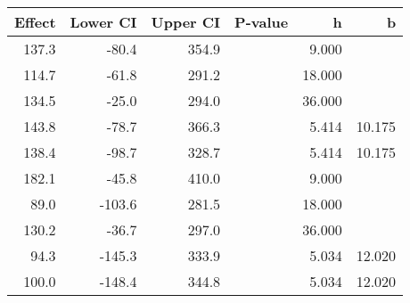 \begin{table}[ht]
\centering
\begin{tabular}{rrrrrr}
  \hline
Effect & Lower CI & Upper CI & P-value & h & b \\ 
  \hline
137.3 & -80.4 & 354.9 &  & 9.000 &  \\ 
  114.7 & -61.8 & 291.2 &  & 18.000 &  \\ 
  134.5 & -25.0 & 294.0 &  & 36.000 &  \\ 
  143.8 & -78.7 & 366.3 &  & 5.414 & 10.175 \\ 
  138.4 & -98.7 & 328.7 &  & 5.414 & 10.175 \\ 
  182.1 & -45.8 & 410.0 &  & 9.000 &  \\ 
  89.0 & -103.6 & 281.5 &  & 18.000 &  \\ 
  130.2 & -36.7 & 297.0 &  & 36.000 &  \\ 
  94.3 & -145.3 & 333.9 &  & 5.034 & 12.020 \\ 
  100.0 & -148.4 & 344.8 &  & 5.034 & 12.020 \\ 
   \hline
\end{tabular}
\end{table}
